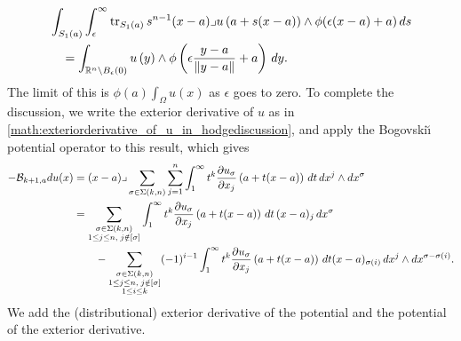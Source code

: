 \documentclass[10pt,a4paper]{article}
\begin{document}
\begin{align*}
	& 
    \int_{ S_1(a) }
    \int_{\epsilon}^\infty 
    \operatorname{tr}_{S_1(a)}{ 
        s^{n-1} (x-a)\lrcorner u\left( a + s( x - a )\right) 
        \wedge \phi( \epsilon (x-a) + a ) 
    }
    \,ds 
    \\&\quad 
	=
	\int_{{\mathbb R}^{n} \setminus B_{\epsilon}(0)}
	    u\left( y \right) 
        \wedge \phi\left( \epsilon \frac{y-a}{\|y-a\|} + a \right) 
    \,dy 
    .
\end{align*}
The limit of this is $\phi(a) \int_\Omega u(x)$ as $\epsilon$ goes to zero. 
To complete the discussion, we write the exterior derivative of $u$ as in \eqref{math:exteriorderivative_of_u_in_hodgediscussion}, 
and apply the Bogovski\u{\i} potential operator to this result, which gives 
\begin{align*}
    - 
    {\mathcal B}_{k+1,a} d u(x)
    &=
    (x-a)\lrcorner 
    \sum_{\sigma \in \Sigma(k,n)} \sum_{j=1}^{n}
    \int_{1}^\infty t^{k} \frac{ \partial u_{\sigma} }{\partial x_{j}}\left(a+t(x-a)\right) \,dt 
    \,dx^{j} \wedge dx^{\sigma}
    \\&
    = 
    \sum_{\substack{ \sigma \in \Sigma(k,n) \\ 1 \leq j \leq n, \; j \notin [\sigma] }} 
    \int_{1}^\infty t^{k} \frac{ \partial u_{\sigma} }{\partial x_{j}}\left(a+t(x-a)\right) \,dt \,(x-a)_{j} \,dx^{\sigma}
    \\&\qquad 
    - 
    \sum_{\substack{ \sigma \in \Sigma(k,n) \\ 1 \leq j \leq n, \; j \notin [\sigma] \\ 1 \leq i \leq k }}
    (-1)^{i-1}
    \int_{1}^\infty t^{k} \frac{ \partial u_{\sigma} }{\partial x_{j}}\left(a+t(x-a)\right) \,dt 
    (x-a)_{\sigma(i)} \,dx^{j} \wedge dx^{\sigma-\sigma(i)}
    .
\end{align*}
We add the (distributional) exterior derivative of the potential and the potential of the exterior derivative.
\end{document}
